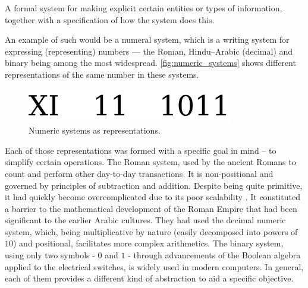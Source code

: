 \begin{definition}\label{def:representation-neuroscience}
A formal system for making explicit certain entities or types of information, together with a specification of how the system does this. \cite{Marr1982}
\end{definition}

An example of such would be a numeral system, which is a writing system for expressing (representing) numbers — the Roman, Hindu–Arabic (decimal) and binary being among the most widespread. \autoref{fig:numeric_systems} shows different representations of the same number in these systems.

\begin{figure}[ht]
    \centering
    \includegraphics[width=0.8\textwidth]{background/images/numeric_systems.png}
    \caption[Numeric systems as representations]{Numeric systems as representations.}
    \label{fig:numeric_systems}
\end{figure}

Each of those representations was formed with a specific goal in mind – to simplify certain operations. The Roman system, used by the ancient Romans to count and perform other day-to-day transactions. It is non-positional \cite{Hazewinkel1990} and governed by principles of subtraction and addition. Despite being quite primitive, it had quickly become overcomplicated due to its poor scalability \cite{Ifrah1998}. It constituted a barrier to the mathematical development of the Roman Empire that had been significant to the earlier Arabic cultures. They had used the decimal numeric system, which, being multiplicative by nature (easily decomposed into powers of $10$) and positional, facilitates more complex arithmetics. The binary system, using only two symbols - $0$ and $1$ - through advancements of the Boolean algebra applied to the electrical switches, is widely used in modern computers. In general, each of them provides a different kind of abstraction to aid a specific objective.

